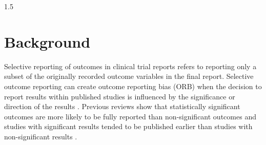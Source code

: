 \documentclass{article}
\begin{document}
\begin{spacing}{1.5}
\newpage


\section{Background} \label{Introduction}
Selective reporting of outcomes in clinical trial reports refers to reporting only a subset of the originally recorded outcome variables in the final report. Selective outcome reporting can create outcome reporting bias (ORB) when the decision to report results within published studies is influenced by the significance or direction of the results \cite{chan2005identifying, lemmens2024outcome}. Previous reviews show that statistically significant outcomes are more likely to be fully reported than non-significant outcomes \cite{chan2005identifying, chan2014increasing, jones2015comparison, glasziou2014reducing, dwan2013systematic} and studies with significant results tended to be published earlier than studies with non-significant results \cite{song2010dissemination, williamson2005outcome}.


\end{spacing}
\end{document}
